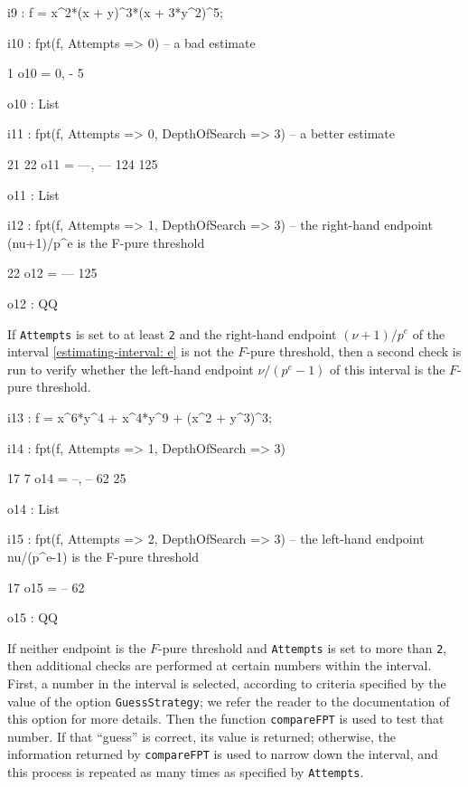 \documentclass{amsart}
\begin{document}
\bigskip
{\small
{}
\begin{MyVerbatim}
i9 : f = x^2*(x + y)^3*(x + 3*y^2)^5;

i10 : fpt(f, Attempts => 0) -- a bad estimate

          1
o10 = {0, -}
          5

o10 : List

i11 : fpt(f, Attempts => 0, DepthOfSearch => 3) -- a better estimate

        21   22
o11 = {---, ---}
       124  125

o11 : List

i12 : fpt(f, Attempts => 1, DepthOfSearch => 3) -- the right-hand
      endpoint (nu+1)/p^e is the F-pure threshold

       22
o12 = ---
      125

o12 : QQ
\end{MyVerbatim}
}

If  \texttt{Attempts} is set to at least \texttt{2} and the right-hand endpoint $(\nu+1)/p^e$ of the interval \eqref{estimating-interval: e} is not the $F$-pure threshold, then a second check is run to verify whether the left-hand endpoint $\nu/(p^e-1)$ of this interval is the $F$-pure threshold.

\bigskip
{\small
{}
\begin{MyVerbatim}
i13 : f = x^6*y^4 + x^4*y^9 + (x^2 + y^3)^3;

i14 : fpt(f, Attempts => 1, DepthOfSearch => 3)

       17   7
o14 = {--, --}
       62  25

o14 : List

i15 : fpt(f, Attempts => 2, DepthOfSearch => 3) -- the left-hand endpoint
      nu/(p^e-1) is the F-pure threshold

      17
o15 = --
      62

o15 : QQ
\end{MyVerbatim}
}

If neither endpoint is the $F$-pure threshold and \texttt{Attempts} is set to more than \texttt{2}, then  additional checks are performed at certain numbers within the interval.
First, a number in the interval is selected, according to criteria specified by the value of the option \texttt{GuessStrategy}; we refer the reader to the documentation of this option for more details.
Then the function \texttt{compareFPT} is used to test that number. If that ``guess'' is correct, its value is returned; otherwise, the information returned by \texttt{compareFPT} is used to narrow down the interval, and this process is repeated as many times as specified by \texttt{Attempts}.
\end{document}
